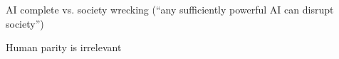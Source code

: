  


AI complete vs. society wrecking (``any sufficiently powerful AI can disrupt society'')

Human parity is irrelevant
